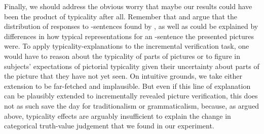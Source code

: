 \documentclass[fleqn,reqno,10pt,draft]{article}
\newcommand{\as}{\acro{as}}
\begin{document}
Finally, we should address the obvious worry that maybe our results
could have been the product of typicality after all. Remember that
\citet{Tielvan-Tiel2012:Embedded-Scalar} and
\citet{GeurtsTielvan-Tiel2013:Scalar-expressi} argue that the
distribution of responses to \as-sentences found by
\citet{CliftonDube2010:Embedded-Implic}, as well as
\citet{ChemlaSpector2010:Experimental-Ev} could be explained by
differences in how typical representations for an \as-sentence the
presented pictures were. To apply typicality-explanations to the
incremental verification task, one would have to reason about the
typicality of parts of pictures or to figure in subjects' expectations
of pictorial typicality given their uncertainty about parts of the
picture that they have not yet seen. On intuitive grounds, we take
either extension to be far-fetched and implausible. But even if this
line of explanation can be plausibly extended to incrementally
revealed picture verification, this does not as such save the day for
traditionalism or grammaticalism, because, as argued above, typicality
effects are arguably insufficient to explain the change in categorical
truth-value judgement that we found in our experiment.
\end{document}
